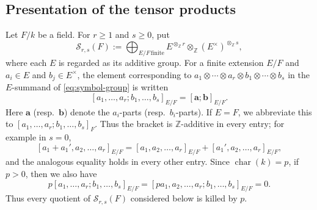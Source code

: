 \documentclass[a4paper,12pt,reqno]{amsart}
\numberwithin{equation}{section}
\theoremstyle{definition}
\newcommand{\Z}{\mathbb{Z}}
\newcommand{\va}{\mathbf{a}}
\newcommand{\vb}{\mathbf{b}}
\begin{document}
\subsection{Presentation of the tensor products}
Let $F/k$ be a field. For $r\geq1$ and $s\geq  0$, put
\begin{equation}\label{eq:symbol-group}
 \mathcal S_{r,s}(F)
 :=\bigoplus_{E/F\,\mathrm{finite}}
 E^{\otimes_{\Z}r}\otimes_{\Z}(E^\times)^{\otimes_{\Z}s},
\end{equation}
where each $E$ is regarded as its additive group.
For a finite extension
$E/F$ and  $a_i\in E$ and $b_j\in E^\times$, the element corresponding to $a_1\otimes \cdots \otimes a_r\otimes b_1\otimes\cdots\otimes b_s$ in the $E$-summand of \eqref{eq:symbol-group} is written
\begin{equation}\label{eq:field-symbol}
 [a_1,\ldots,a_r;b_1,\ldots,b_s]_{E/F}=[\va;\vb]_{E/F}.
\end{equation}
Here $\va$ (resp.~$\vb$) denote the $a_i$-parts (resp.~$b_i$-parts).
If $E=F$, we abbreviate this
to $[a_1,\ldots,a_r;b_1,\ldots,b_s]_F$.
Thus the bracket is $\Z$-additive in every
entry; for example in $s=0$,
\begin{equation}\label{eq:addsym}
 [a_1+a_1',a_2,\ldots,a_r]_{E/F}
 = [a_1,a_2,\ldots,a_r]_{E/F}
 +[a_1',a_2,\ldots,a_r]_{E/F},
\end{equation}
and the analogous equality holds in every other entry.  Since $\operatorname{char}(k)=p$, 
if $p>0$, then we also have
\begin{equation}\label{eq:ptor}
 p[a_1,\ldots,a_r;b_1,\ldots,b_s]_{E/F}
 =[pa_1,a_2,\ldots,a_r;b_1,\ldots,b_s]_{E/F}=0.
\end{equation}
Thus every quotient of $\mathcal S_{r,s}(F)$ considered below is killed by $p$.
\end{document}

